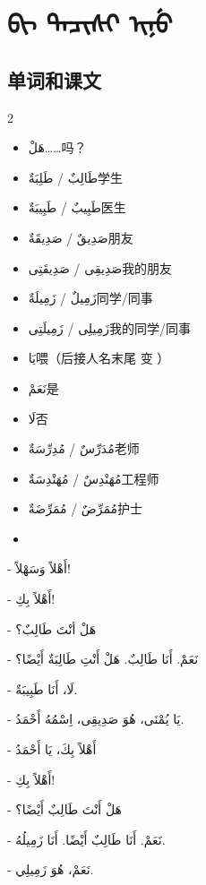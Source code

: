 \chapter{\textmongolian{ᠪᡳ ᡨᠠᠴᡳᠰᡳ ᡳᠨᡠ}}

\section{ 单词和课文}

\begin{multicols}{2}
    \begin{itemize}
        \item \ac{هَلْ}{……吗？}
        \item \ac{طَالِبٌ / طَلِبَةٌ}{学生}
        \item \ac{طَبِيبٌ / طَبِيبَةٌ}{医生}
        \item \ac{صَدِيقٌ / صَدِيقَةٌ}{朋友}
        \item \ac{صَدِيقِى / صَدِيقَتِى}{我的朋友}
        \item \ac{زَمِيلٌ / زَمِيلَةٌ}{同学/同事}
        \item \ac{زَمِيلِى / زَمِيلَتِى}{我的同学/同事}
        \item \ac{يَا}{喂（后接人名末尾  变 ）}
        \item \ac{نَعَمْ}{是}
        \item \ac{لَا}{否}
        \item \ac{مُدَرِّسٌ / مُدِرِّسَةٌ}{老师}
        \item \ac{مُهَنْدِسٌ / مُهَنْدِسَةٌ}{工程师}
        \item \ac{مُمَرِّضٌ / مُمَرِّضَةٌ}{护士}
        \item []
    \end{itemize}
\end{multicols}


\begin{Arabic}
    - أَهْلاً وَسَهْلاً!

    - أَهْلاً بِكِ!

    - هَلْ أنْتَ طَالِبٌ؟

    - نَعَمْ. أَنَا طَالِبٌ. هَلْ أَنْتِ طَالِبَةٌ أَيْضًا؟

    - لَا، أَنَا طَبِيبَةٌ.

    - يَا يُمْنَى، هُوَ صَدِيقِى، اِسْمُهُ أَحْمَدُ.

    - أَهْلاً بِكَ، يَا أَحْمَدُ

    - أَهْلاً بِكِ!

    - هَلْ أَنْتَ طَالِبٌ أَيْضًا؟

    - نَعَمْ. أَنَا طَالِبٌ أَيْضًا. أَنَا زَمِيلُهُ.

    - نَعَمْ، هُوَ زَمِيلِي.
\end{Arabic}

